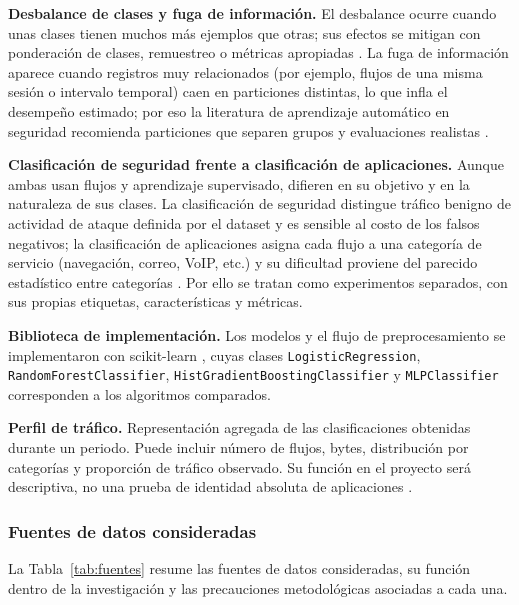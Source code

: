 \documentclass[conference]{IEEEtran}
\begin{document}
\textbf{Desbalance de clases y fuga de información.} El desbalance ocurre cuando unas clases tienen muchos más ejemplos que otras; sus efectos se mitigan con ponderación de clases, remuestreo o métricas apropiadas \cite{chicco2020,hastie2009}. La fuga de información aparece cuando registros muy relacionados (por ejemplo, flujos de una misma sesión o intervalo temporal) caen en particiones distintas, lo que infla el desempeño estimado; por eso la literatura de aprendizaje automático en seguridad recomienda particiones que separen grupos y evaluaciones realistas \cite{arp2022}.

\textbf{Clasificación de seguridad frente a clasificación de aplicaciones.} Aunque ambas usan flujos y aprendizaje supervisado, difieren en su objetivo y en la naturaleza de sus clases. La clasificación de seguridad distingue tráfico benigno de actividad de ataque definida por el dataset y es sensible al costo de los falsos negativos; la clasificación de aplicaciones asigna cada flujo a una categoría de servicio (navegación, correo, VoIP, etc.) y su dificultad proviene del parecido estadístico entre categorías \cite{shen2023,pacheco2019}. Por ello se tratan como experimentos separados, con sus propias etiquetas, características y métricas.

\textbf{Biblioteca de implementación.} Los modelos y el flujo de preprocesamiento se implementaron con scikit-learn \cite{pedregosa2011}, cuyas clases \texttt{LogisticRegression}, \texttt{RandomForestClassifier}, \texttt{HistGradientBoostingClassifier} y \texttt{MLPClassifier} corresponden a los algoritmos comparados.

\textbf{Perfil de tráfico.} Representación agregada de las clasificaciones obtenidas durante un periodo. Puede incluir número de flujos, bytes, distribución por categorías y proporción de tráfico observado. Su función en el proyecto será descriptiva, no una prueba de identidad absoluta de aplicaciones \cite{shen2023}.

\subsubsection{Fuentes de datos consideradas}

La Tabla~\ref{tab:fuentes} resume las fuentes de datos consideradas, su función dentro de la investigación y las precauciones metodológicas asociadas a cada una.
\end{document}
